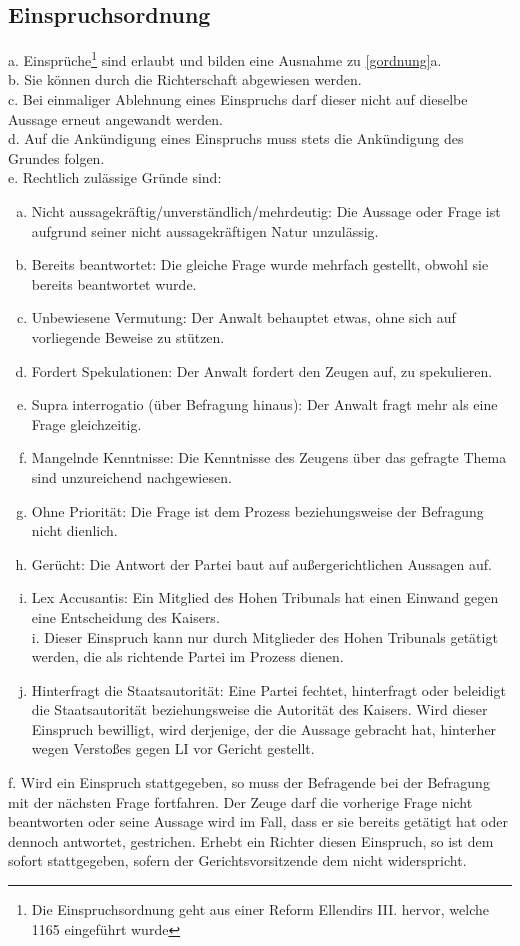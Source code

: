 \documentclass{article}
\begin{document}
\subsection{Einspruchsordnung}
\label{eordnung}
a. Einsprüche\footnote{Die Einspruchsordnung geht aus einer Reform Ellendirs III. hervor, welche 1165 eingeführt wurde} sind erlaubt und bilden eine Ausnahme zu \ref{gordnung}a.\\
b. Sie können durch die Richterschaft abgewiesen werden.\\
c. Bei einmaliger Ablehnung eines Einspruchs darf dieser nicht auf dieselbe Aussage erneut angewandt werden.\\
d. Auf die Ankündigung eines Einspruchs muss stets die Ankündigung des Grundes folgen.\\
e. Rechtlich zulässige Gründe sind:
\begin{enumerate}[a)]
\item Nicht aussagekräftig/unverständlich/mehrdeutig: Die Aussage oder Frage ist aufgrund seiner nicht aussagekräftigen Natur unzulässig.
\item Bereits beantwortet: Die gleiche Frage wurde mehrfach gestellt, obwohl sie bereits beantwortet wurde.
\item Unbewiesene Vermutung: Der Anwalt behauptet etwas, ohne sich auf vorliegende Beweise zu stützen.
\item Fordert Spekulationen: Der Anwalt fordert den Zeugen auf, zu spekulieren.
\item Supra interrogatio (über Befragung hinaus): Der Anwalt fragt mehr als eine Frage gleichzeitig.
\item Mangelnde Kenntnisse: Die Kenntnisse des Zeugens über das gefragte Thema sind unzureichend nachgewiesen.
\item Ohne Priorität: Die Frage ist dem Prozess beziehungsweise der Befragung nicht dienlich.
\item Gerücht: Die Antwort der Partei baut auf außergerichtlichen Aussagen auf.
\item Lex Accusantis: Ein Mitglied des Hohen Tribunals hat einen Einwand gegen eine Entscheidung des Kaisers.\\
i. Dieser Einspruch kann nur durch Mitglieder des Hohen Tribunals getätigt werden, die als richtende Partei im Prozess dienen.\\
\item Hinterfragt die Staatsautorität: Eine Partei fechtet, hinterfragt oder beleidigt die Staatsautorität beziehungsweise die Autorität des Kaisers. Wird dieser Einspruch bewilligt, wird derjenige, der die Aussage gebracht hat, hinterher wegen Verstoßes gegen LI vor Gericht gestellt.
\end{enumerate}
f. Wird ein Einspruch stattgegeben, so muss der Befragende bei der Befragung mit der nächsten Frage fortfahren. Der Zeuge darf die vorherige Frage nicht beantworten oder seine Aussage wird im Fall, dass er sie bereits getätigt hat oder dennoch antwortet, gestrichen. Erhebt ein Richter diesen Einspruch, so ist dem sofort stattgegeben, sofern der Gerichtsvorsitzende dem nicht widerspricht.
\end{document}
